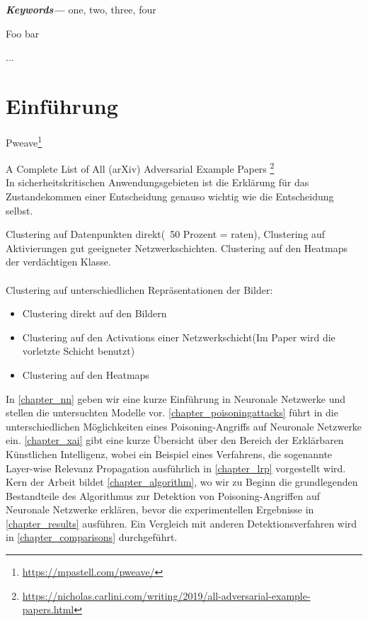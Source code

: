 \documentclass[twoside, 11pt,a4paper]{article}
\providecommand{\keywords}[1]
{
	\small	
	\textbf{\textit{Keywords---}} #1
}
\numberwithin{equation}{section}
\begin{document}
	\keywords{one, two, three, four}
	\newpage
	\listoffigures
	
	\listoftables
	
	\lstlistoflistings
	
	\listofalgorithms
	\newpage
	\tableofcontents
	\newpage
	
	
	
	
	\begin{algorithm} 
		\caption{Foo bar} 
		... 
	\end{algorithm} 
	\section{Einführung}
	
	Pweave\footnote{\url{https://mpastell.com/pweave/}}
	
	A Complete List of All (arXiv) Adversarial Example Papers \footnote{\url{https://nicholas.carlini.com/writing/2019/all-adversarial-example-papers.html}}
	\\
	In sicherheitskritischen Anwendungsgebieten ist die Erklärung für das Zustandekommen einer Entscheidung genauso wichtig wie die Entscheidung selbst\cite{LRP_DNN}.
	
	Clustering auf Datenpunkten direkt(~50 Prozent = raten), Clustering auf Aktivierungen gut geeigneter Netzwerkschichten. Clustering auf den Heatmaps der verdächtigen Klasse.\\
	\\
	
	Clustering auf unterschiedlichen Repräsentationen der Bilder:
	\begin{itemize}
		\item Clustering direkt auf den Bildern\\
		\item Clustering auf den Activations einer Netzwerkschicht(Im Paper \cite{AC} wird die vorletzte Schicht benutzt)
		\item Clustering auf den Heatmaps
	\end{itemize}
	In \autoref{chapter_nn} geben wir eine kurze Einführung in Neuronale Netzwerke und stellen die untersuchten Modelle vor. \autoref{chapter_poisoningattacks} führt in die unterschiedlichen Möglichkeiten eines Poisoning-Angriffs auf Neuronale Netzwerke ein. \autoref{chapter_xai} gibt eine kurze Übersicht über den Bereich der Erklärbaren Künstlichen Intelligenz, wobei ein Beispiel eines Verfahrens, die sogenannte Layer-wise Relevanz Propagation ausführlich in \autoref{chapter_lrp} vorgestellt wird. Kern der Arbeit bildet \autoref{chapter_algorithm}, wo wir zu Beginn die grundlegenden Bestandteile des Algorithmus zur Detektion von Poisoning-Angriffen auf Neuronale Netzwerke erklären, bevor die experimentellen Ergebnisse in \autoref{chapter_results} ausführen. Ein Vergleich mit anderen Detektionsverfahren wird in \autoref{chapter_comparisons} durchgeführt.
\end{document}
